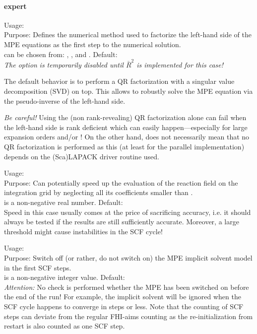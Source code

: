 \paragraph{expert}

{
  \noindent
  Usage:   \\[1.0ex] 
  Purpose: Defines the numerical method used to factorize the 
    left-hand side of the MPE equations as the first step to 
    the numerical solution. \\[1.0ex]
   can be chosen from: , , 
    and . Default:  \\
}
\emph{The option}  \emph{is temporarily disabled until
$\bar{R}^2$ is implemented for this case!}

The default behavior is to perform a QR factorization with a 
singular value decomposition (SVD) on top. This allows to 
robustly solve the MPE equation via the pseudo-inverse of 
the left-hand side. 

\emph{Be careful!} Using the (non rank-revealing) QR 
factorization alone can fail when the left-hand side is 
rank deficient which can easily happen---especially 
for large expansion orders 
 and/or ! 
On the other hand,  does not necessarily mean that 
no QR factorization is performed as this (at least for 
the parallel implementation) depends on the (Sca)LAPACK 
driver routine used. 


{
  \noindent
  Usage:  
     \\[1.0ex] 
  Purpose: Can potentially speed up the evaluation of 
    the reaction field on the integration grid by 
    neglecting all its coefficients smaller than
    . \\[1.0ex]
   is a non-negative real number. 
    Default:  \\
}
Speed in this case usually comes at the price of 
sacrificing accuracy, i.e. it should always be tested 
if the results are still sufficiently accurate. 
Moreover, a large threshold might cause instabilities 
in the SCF cycle!


{
  \noindent
  Usage:   \\[1.0ex] 
  Purpose: Switch off (or rather, do not switch on) the 
    MPE implicit solvent model in the first 
     SCF steps. \\[1.0ex]
   is a non-negative integer value. Default:  \\
}
\emph{Attention:} No check is performed whether the MPE 
has been switched on before the end of the run! For example, 
the implicit solvent will be ignored when the SCF cycle 
happens to converge in  steps or less. 
Note that the counting of SCF steps can deviate from the 
regular FHI-aims counting as the re-initialization 
from restart is also counted as one SCF step. 

